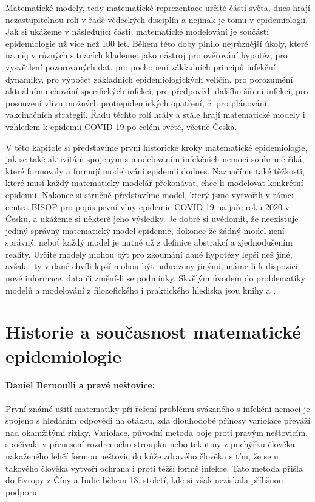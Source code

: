 Matematické modely, tedy matematické reprezentace určité části světa, dnes hrají nezastupitelnou roli v řadě vědeckých disciplín a nejinak je tomu v epidemiologii. Jak si ukážeme v následující části, matematické modelování je součástí epidemiologie už více než 100 let. Během této doby plnilo nejrůznější úkoly, které na něj v různých situacích klademe: jako nástroj pro ověřování hypotéz, pro vysvětlení pozorovaných dat, pro pochopení základních principů infekční dynamiky, pro výpočet základních epidemiologických veličin, pro porozumění aktuálnímu chování specifických infekcí, pro předpovědi dalšího šíření infekcí, pro posouzení vlivu možných protiepidemických opatření, či pro plánování vakcinačních strategií. Řadu těchto rolí hrály a stále hrají matematické modely i vzhledem k epidemii COVID-19 po celém světě, včetně Česka.

V této kapitole si představíme první historické kroky matematické epidemiologie, jak se také aktivitám spojeným s modelováním infekčních nemocí souhrnně říká, které formovaly a formují modelování epidemií dodnes. Naznačíme také těžkosti, které musí každý matematický modelář překonávat, chce-li modelovat konkrétní epidemii. Nakonec si stručně představíme model, který jsme vytvořili v rámci centra BISOP pro popis první vlny epidemie COVID-19 na jaře roku 2020 v Česku, a ukážeme si některé jeho výsledky. Je dobré si uvědomit, že neexistuje jediný správný matematický model epidemie, dokonce že žádný model není správný, neboť každý model je nutně už z definice abstrakcí a zjednodušením reality. Určité modely mohou být pro zkoumání dané hypotézy lepší než jiné, avšak i ty v dané chvíli lepší mohou být nahrazeny jinými, máme-li k dispozici nové informace, data či změní-li se podmínky. Skvělým úvodem do problematiky modelů a modelování z filozofického i praktického hlediska jsou knihy \cite{GerleeLundh2016} a \cite{HilbornMangel1997}.

\section*{Historie a současnost matematické epidemiologie}


\paragraph{Daniel Bernoulli a pravé neštovice:} První známé užití matematiky při řešení problému svázaného s infekční nemocí je spojeno s hledáním odpovědi na otázku, zda dlouhodobé přínosy variolace převáží nad okamžitými riziky. Variolace, původní metoda boje proti pravým neštovicím, spočívala v přenesení rozdrceného stroupku nebo tekutiny z puchýřku člověka nakaženého lehčí formou neštovic do kůže zdravého člověka s tím, že se u takového člověka vytvoří ochrana i proti těžší formě infekce. Tato metoda přišla do Evropy z Číny a Indie během 18. století, kde si však nezískala přílišnou podporu. 

